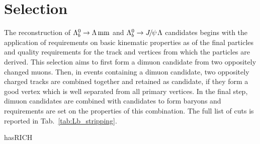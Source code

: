 \chapter{Selection}
\label{sec:Lb_selection}

The reconstruction of ${{\Lambda}^0_{b}}\rightarrow{\ensuremath{\Lambda}}\rm \,mm$ and $\Lb\to\jpsi\Lz$ candidates begins with the application of
requirements on basic kinematic properties as \pt of the final particles and quality requirements
for the track and vertices from which the particles are derived.
This selection aims to first form a dimuon candidate from two oppositely changed muons. 
Then, in events containing a dimuon candidate, two oppositely charged tracks are combined
together and retained as \Lz candidate, if they form a good vertex which is well separated
from all primary vertices. In the final step, dimuon candidates are combined with \Lz candidates to form \Lb
baryons and requirements are set on the properties of this combination. 
The full list of cuts is reported in Tab.~\ref{tab:Lb_stripping}.
%
 \begin{verbbox}hasRICH\end{verbbox}
